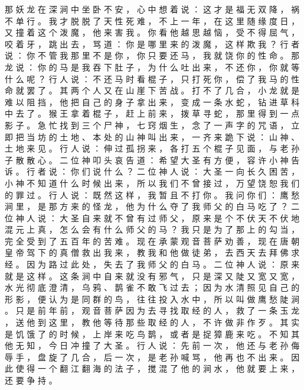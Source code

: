 {那 妖 龙 在 深 涧 中 坐 卧 不 安 ， 心 中 想 着 说 ： 这 才 是 福 无 双 降 ， 祸 不 单 行 。
我 才 脱 脱 了 天 性 死 难 ， 不 上 一 年 ， 在 这 里 随 缘 度 日 ， 又 撞 着 这 个 泼 魔 ， 他 来 害 我 。
你 看 他 越 思 越 恼 ， 受 不 得 屈 气 ， 咬 着 牙 ， 跳 出 去 ， 骂 道 ： 你 是 哪 里 来 的 泼 魔 ， 这 样 欺 我 ？ 行 者 说 ： 你 不 管 我 那 里 不 是 你 ， 你 只 要 还 马 ， 我 就 饶 你 的 性 命 。
那 龙 说 ： 你 的 马 是 我 吞 下 肚 子 ， 为 什 么 吐 出 来 ， 不 还 你 ， 你 就 等 什 么 呢 ？ 行 人 说 ： 不 还 马 时 看 棍 子 ， 只 打 死 你 ， 偿 了 我 马 的 性 命 就 罢 了 。
其 两 个 人 又 在 山 崖 下 苦 战 。
打 不 了 几 合 ， 小 龙 就 是 难 以 阻 挡 ， 他 把 自 己 的 身 子 拿 出 来 ， 变 成 一 条 水 蛇 ， 钻 进 草 科 中 去 了 。
猴 王 拿 着 棍 子 ， 赶 上 前 来 ， 拨 草 寻 蛇 ， 那 里 得 到 一 点 影 子 。
急 忙 找 到 三 个 尸 神 ， 七 窍 烟 生 ， 念 了 一 声 字 的 咒 语 ， 立 即 把 当 坊 的 土 地 、 本 处 的 山 神 叫 出 来 ， 一 齐 来 跪 下 说 ： 山 神 、 土 地 来 见 。
行 人 说 ： 伸 过 孤 拐 来 ， 各 打 五 个 棍 子 见 面 ， 与 老 孙 子 散 散 心 。
二 位 神 叩 头 哀 告 道 ： 希 望 大 圣 有 方 便 ， 容 许 小 神 告 诉 。
行 者 说 ： 你 们 说 什 么 ？ 二 位 神 人 说 ： 大 圣 一 向 长 久 困 苦 ， 小 神 不 知 道 什 么 时 候 出 来 ， 所 以 我 们 不 曾 接 过 ， 万 望 饶 恕 我 们 的 罪 过 。
行 人 说 ： 既 然 这 样 ， 我 暂 且 不 打 你 。
我 问 你 们 ： 鹰 愁 涧 里 ， 是 那 方 来 的 怪 龙 ， 他 为 什 么 夺 了 我 师 父 的 白 马 吃 了 ？ 二 位 神 人 说 ： 大 圣 自 来 就 不 曾 有 过 师 父 ， 原 来 是 个 不 伏 天 不 伏 地 混 元 上 真 ， 怎 么 会 有 什 么 师 父 的 马 ？
我 只 是 为 了 那 上 的 勾 当 ， 完 全 受 到 了 五 百 年 的 苦 难 。
现 在 承 蒙 观 音 菩 萨 劝 善 ， 现 在 唐 朝 皇 帝 驾 下 的 真 僧 救 出 我 来 ， 教 我 和 他 做 徒 弟 ， 去 西 天 去 拜 佛 求 经 。
因 为 路 过 此 处 ， 失 去 了 我 师 父 的 白 马 。
二 位 神 人 说 ： 原 来 就 是 这 样 。
这 条 涧 中 自 来 就 没 有 邪 气 ， 只 是 深 又 陡 又 宽 又 宽 ， 水 光 彻 底 澄 清 ， 乌 鸦 、 鹊 雀 不 敢 飞 过 去 ； 因 为 水 清 照 见 自 己 的 形 影 ， 便 认 为 是 同 群 的 鸟 ， 往 往 投 入 水 中 ， 所 以 叫 做 鹰 愁 陡 涧 。
只 是 前 年 前 ， 观 音 菩 萨 因 为 去 寻 找 取 经 的 人 ， 救 了 一 条 玉 龙 ， 送 他 到 这 里 ， 教 他 等 待 那 些 取 经 的 人 ， 不 许 做 非 作 歹 。
其 实 是 饥 饿 了 的 时 候 ， 上 岸 来 吃 鸟 鹊 ， 或 者 是 捉 獐 鹿 来 吃 。
不 知 其 他 无 知 ， 今 日 冲 撞 了 大 圣 。
行 人 说 ： 先 前 一 次 ， 他 还 与 老 孙 侮 辱 手 ， 盘 旋 了 几 合 ， 后 一 次 ， 是 老 孙 喊 骂 ， 他 再 也 不 出 来 。
因 此 使 得 一 个 翻 江 翻 海 的 法 子 ， 搅 混 了 他 的 涧 水 ， 他 就 要 上 来 ， 还 要 争 持 。
}
